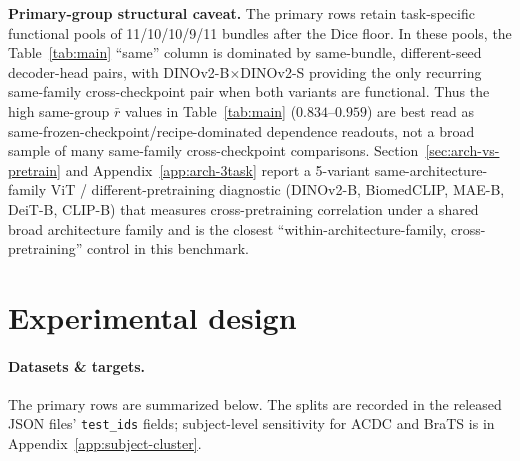 \documentclass{article}
\begin{document}
\textbf{Primary-group structural caveat.} The primary rows retain task-specific functional pools of 11/10/10/9/11 bundles after the Dice floor. In these pools, the Table~\ref{tab:main} ``same'' column is dominated by same-bundle, different-seed decoder-head pairs, with DINOv2-B$\times$DINOv2-S providing the only recurring same-family cross-checkpoint pair when both variants are functional. Thus the high same-group $\bar r$ values in Table~\ref{tab:main} ($0.834$--$0.959$) are best read as same-frozen-checkpoint/recipe-dominated dependence readouts, not a broad sample of many same-family cross-checkpoint comparisons. Section~\ref{sec:arch-vs-pretrain} and Appendix~\ref{app:arch-3task} report a 5-variant same-architecture-family ViT / different-pretraining diagnostic (DINOv2-B, BiomedCLIP, MAE-B, DeiT-B, CLIP-B) that measures cross-pretraining correlation under a shared broad architecture family and is the closest ``within-architecture-family, cross-pretraining'' control in this benchmark.

\section{Experimental design}
\label{sec:design}

\paragraph{Datasets \& targets.} The primary rows are summarized below. The splits are recorded in the released JSON files' \texttt{test\_ids} fields; subject-level sensitivity for ACDC and BraTS is in Appendix~\ref{app:subject-cluster}.
\end{document}

